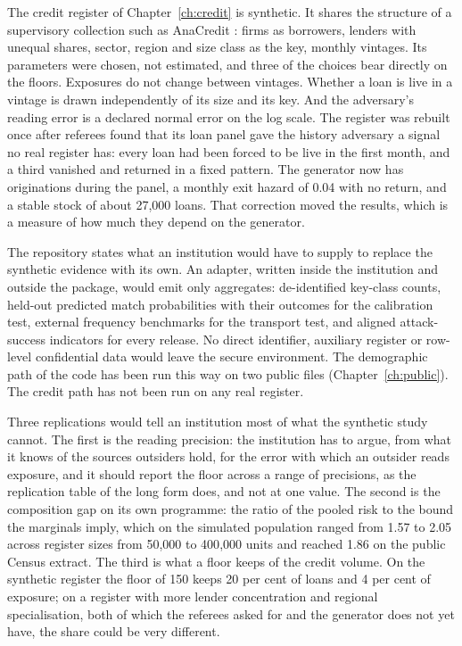 The credit register of Chapter~\ref{ch:credit} is synthetic. It shares the structure
of a supervisory collection such as AnaCredit \citep{israel2017,ecb2016}: firms as
borrowers, lenders with unequal shares, sector, region and size class as the key,
monthly vintages. Its parameters were chosen, not estimated, and three of the choices
bear directly on the floors. Exposures do not change between vintages. Whether a loan
is live in a vintage is drawn independently of its size and its key. And the
adversary's reading error is a declared normal error on the log scale. The register
was rebuilt once after referees found that its loan panel gave the history adversary
a signal no real register has: every loan had been forced to be live in the first
month, and a third vanished and returned in a fixed pattern. The generator now has
originations during the panel, a monthly exit hazard of 0.04 with no return, and a
stable stock of about 27{,}000 loans.
That correction moved the results, which is a measure of how much they depend on the
generator.

The repository states what an institution would have to supply to replace the
synthetic evidence with its own. An adapter, written inside the institution and
outside the package, would emit only aggregates: de-identified key-class counts,
held-out predicted match probabilities with their outcomes for the calibration test,
external frequency benchmarks for the transport test, and aligned attack-success
indicators for every release. %
No direct identifier, auxiliary register or row-level confidential data would leave
the secure environment. The demographic path of the code has been run this way on two
public files (Chapter~\ref{ch:public}). The credit path has not been run on any real
register.

Three replications would tell an institution most of what the synthetic study cannot.
The first is the reading precision: the institution has to argue, from what it knows
of the sources outsiders hold, for the error with which an outsider reads exposure,
and it should report the floor across a range of precisions, as the replication
table of the long form does, and not at one value. The second is
the composition gap on its own programme: the ratio of the pooled risk to the bound the
marginals imply, which on the simulated population ranged from 1.57 to 2.05 across
register sizes from 50{,}000 to 400{,}000 units and reached 1.86 on the public Census
extract. %
The third is what a floor keeps of the credit volume. On the synthetic register the
floor of 150 keeps 20 per cent of loans and 4 per cent of exposure; on a register
with more lender concentration and regional specialisation, both of which the referees
asked for and the generator does not yet have, the share could be very different.

